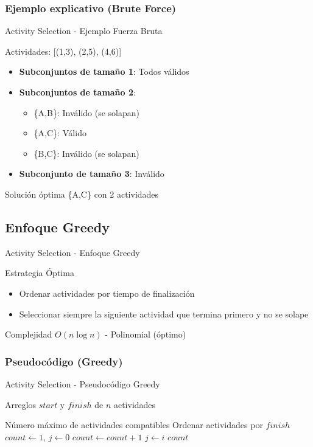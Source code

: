 \documentclass[aspectratio=169]{beamer}
\renewcommand{\algorithmicrequire}{\textbf{Entrada:}}
\renewcommand{\algorithmicensure}{\textbf{Salida:}}
\newcommand{\REQUIRE}{\item[\algorithmicrequire]}
\newcommand{\ENSURE}{\item[\algorithmicensure]}
\begin{document}
\subsubsection{Ejemplo explicativo (Brute Force)}
\begin{frame}{Activity Selection - Ejemplo Fuerza Bruta}
\begin{exampleblock}{Actividades: [(1,3), (2,5), (4,6)]}
\begin{itemize}
\item \textbf{Subconjuntos de tamaño 1}: Todos válidos
\item \textbf{Subconjuntos de tamaño 2}: 
\begin{itemize}
\item \{A,B\}: Inválido (se solapan)
\item \{A,C\}: Válido
\item \{B,C\}: Inválido (se solapan)
\end{itemize}
\item \textbf{Subconjunto de tamaño 3}: Inválido
\end{itemize}
\end{exampleblock}

\begin{block}{Solución óptima}
\{A,C\} con 2 actividades
\end{block}
\end{frame}

\subsection{Enfoque Greedy}
\begin{frame}{Activity Selection - Enfoque Greedy}
\begin{block}{Estrategia Óptima}
\begin{itemize}
\item Ordenar actividades por tiempo de finalización
\item Seleccionar siempre la siguiente actividad que termina primero y no se solape
\end{itemize}
\end{block}

\begin{alertblock}{Complejidad}
$O(n \log n)$ - Polinomial (óptimo)
\end{alertblock}
\end{frame}

\subsubsection{Pseudocódigo (Greedy)}
\begin{frame}[fragile]{Activity Selection - Pseudocódigo Greedy}
\begin{algorithmic}[1]
\REQUIRE Arreglos $start$ y $finish$ de $n$ actividades
\ENSURE Número máximo de actividades compatibles
\State Ordenar actividades por $finish$
\State $count \leftarrow 1$, $j \leftarrow 0$
        \State $count \leftarrow count + 1$
        \State $j \leftarrow i$
    \EndIf
\EndFor
\Return $count$
\end{algorithmic}
\end{frame}
\end{document}
